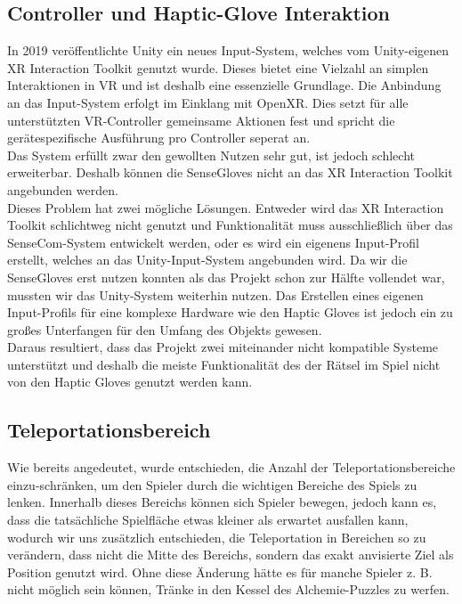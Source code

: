 \subsection{Controller und Haptic-Glove Interaktion}
In 2019 veröffentlichte Unity ein neues Input-System, welches vom Unity-eigenen XR Interaction Toolkit genutzt wurde. Dieses bietet eine Vielzahl an simplen Interaktionen in VR und ist deshalb eine essenzielle Grundlage. Die Anbindung an das Input-System erfolgt im Einklang mit OpenXR. Dies setzt für alle unterstützten VR-Controller gemeinsame Aktionen fest und spricht die gerätespezifische Ausführung pro Controller seperat an.\\

Das System erfüllt zwar den gewollten Nutzen sehr gut, ist jedoch schlecht erweiterbar. Deshalb können die SenseGloves nicht an das XR Interaction Toolkit angebunden werden. \\

Dieses Problem hat zwei mögliche Lösungen. Entweder wird das XR Interaction Toolkit schlichtweg nicht genutzt und Funktionalität muss ausschließlich über das SenseCom-System entwickelt werden, oder es wird ein eigenens Input-Profil erstellt, welches an das Unity-Input-System angebunden wird. Da wir die SenseGloves erst nutzen konnten als das Projekt schon zur Hälfte vollendet war, mussten wir das Unity-System weiterhin nutzen. Das Erstellen eines eigenen Input-Profils für eine komplexe Hardware wie den Haptic Gloves ist jedoch ein zu großes Unterfangen für den Umfang des Objekts gewesen.\\

Daraus resultiert, dass das Projekt zwei miteinander nicht kompatible Systeme unterstützt und deshalb die meiste Funktionalität des der Rätsel im Spiel nicht von den Haptic Gloves genutzt werden kann.

\subsection{Teleportationsbereich}
Wie bereits angedeutet, wurde entschieden, die Anzahl der Teleportationsbereiche einzu-schränken, um den Spieler durch die wichtigen Bereiche des Spiels zu lenken. Innerhalb dieses Bereichs können sich Spieler bewegen, jedoch kann es, dass die tatsächliche Spielfläche etwas kleiner als erwartet ausfallen kann, wodurch wir uns zusätzlich entschieden, die Teleportation in Bereichen so zu verändern, dass nicht die Mitte des Bereichs, sondern das exakt anvisierte Ziel als Position genutzt wird. Ohne diese Änderung hätte es für manche Spieler z. B. nicht möglich sein können, Tränke in den Kessel des Alchemie-Puzzles zu werfen.
